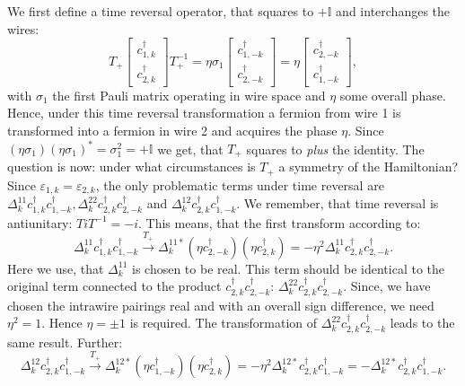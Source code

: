 We first define a time reversal operator, that squares to $ + \mathbb{I}$ and interchanges the wires: 
\begin{equation}
T_+\begin{bmatrix} c^\dagger_{1,k} \\ c^\dagger_{2,k} \end{bmatrix} T_+^{-1} = \eta\sigma_1 \begin{bmatrix} c^\dagger_{1,-k} \\ c^\dagger_{2,-k} \end{bmatrix} = \eta\begin{bmatrix} c^\dagger_{2,-k} \\ c^\dagger_{1,-k} \end{bmatrix},\nonumber
\end{equation} 
with $\sigma_1$ the first Pauli matrix operating in wire space and $\eta$ some overall phase. Hence, under this time reversal transformation a fermion from wire 1 is transformed into a fermion in wire 2 and acquires the phase $\eta$. Since $(\eta\sigma_1)(\eta\sigma_1)^* = \sigma_1^2 = + \mathbb{I}$ we get, that $T_+$ squares to \textit{plus} the identity. The question is now: under what circumstances is $T_+$ a symmetry of the Hamiltonian? Since $\varepsilon_{1,k} = \varepsilon_{2,k}$, the only problematic terms under time reversal are $\Delta^{11}_k c^\dagger_{1,k}c^\dagger_{1,-k}, \Delta^{22}_k c^\dagger_{2,k}c^\dagger_{2,-k}$ and $\Delta^{12}_kc^\dagger_{2,k}c^\dagger_{1,-k}$. We remember, that time reversal is antiunitary: $TiT^{-1} = -i$. This means, that the first transform according to:
\begin{equation}
\Delta^{11}_k c^\dagger_{1,k}c^\dagger_{1,-k} \overset{T_+}{\to} \Delta^{11*}_k \left(\eta c^\dagger_{2,-k}\right)\left(\eta c^\dagger_{2,k}\right) = -\eta^2\Delta^{11}_k c^\dagger_{2,k}c^\dagger_{2,-k}. \nonumber
\end{equation}
Here we use, that $\Delta^{11}_k$ is chosen to be real. This term should be identical to the original term connected to the product $c^\dagger_{2,k}c^\dagger_{2,-k}$: $\Delta^{22}_k c^\dagger_{2,k}c^\dagger_{2,-k}$. Since, we have chosen the intrawire pairings real and with an overall sign difference, we need $\eta^2 = 1$. Hence $\eta = \pm 1$ is required. The transformation of $\Delta^{22}_k c^\dagger_{2,k}c^\dagger_{2,-k}$ leads to the same result. Further:
\begin{equation}
\Delta^{12}_k c^\dagger_{2,k}c^\dagger_{1,-k} \overset{T_+}{\to} \Delta^{12*}_k \left(\eta c^\dagger_{1,-k}\right)\left( \eta c^\dagger_{2,k}\right) = -\eta^2 \Delta^{12*}_k c^\dagger_{2,k}c^\dagger_{1,-k} = - \Delta^{12*}_k c^\dagger_{2,k}c^\dagger_{1,-k}. \nonumber
\end{equation}
